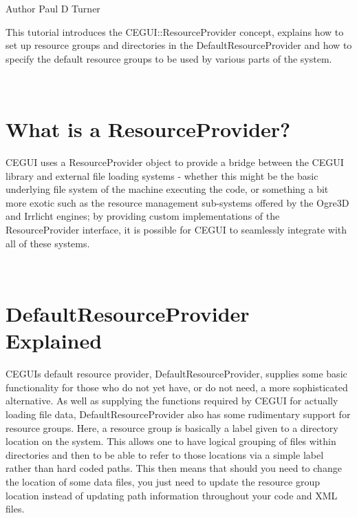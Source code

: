 \begin{DoxyAuthor}{Author}
Paul D Turner
\end{DoxyAuthor}
This tutorial introduces the C\+E\+G\+U\+I\+::\+Resource\+Provider concept, explains how to set up resource groups and directories in the Default\+Resource\+Provider and how to specify the default resource groups to be used by various parts of the system.

~\newline
 \hypertarget{resprov_tutorial_resprov_tutorial_intro}{}\section{What is a Resource\+Provider?}\label{resprov_tutorial_resprov_tutorial_intro}
C\+E\+G\+UI uses a Resource\+Provider object to provide a bridge between the C\+E\+G\+UI library and external file loading systems -\/ whether this might be the basic underlying file system of the machine executing the code, or something a bit more exotic such as the resource management sub-\/systems offered by the Ogre3D and Irrlicht engines; by providing custom implementations of the Resource\+Provider interface, it is possible for C\+E\+G\+UI to seamlessly integrate with all of these systems.

~\newline
 \hypertarget{resprov_tutorial_resprov_tutorial_default_rp}{}\section{Default\+Resource\+Provider Explained}\label{resprov_tutorial_resprov_tutorial_default_rp}
C\+E\+G\+UI\textquotesingle{}s default resource provider, Default\+Resource\+Provider, supplies some basic functionality for those who do not yet have, or do not need, a more sophisticated alternative. As well as supplying the functions required by C\+E\+G\+UI for actually loading file data, Default\+Resource\+Provider also has some rudimentary support for \textquotesingle{}resource groups\textquotesingle{}. Here, a resource group is basically a label given to a directory location on the system. This allows one to have logical grouping of files within directories and then to be able to refer to those locations via a simple label rather than hard coded paths. This then means that should you need to change the location of some data files, you just need to update the resource group location instead of updating path information throughout your code and X\+ML files.

